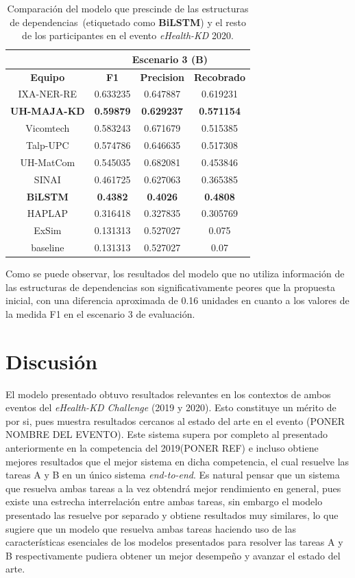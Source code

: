 \begin{table}[tb!]\centering
	\begin{tabular}{|c|c|c|c|}
		\hline
		&  \multicolumn{3}{c|}{\textbf{Escenario 3 (B)}} \\
		\hline
		\textbf{Equipo} & \textbf{F1} & \textbf{Precision} & \textbf{Recobrado} \\
		\hline
		IXA-NER-RE & 0.633235 & 0.647887 & 0.619231 \\
		\textbf{UH-MAJA-KD} & \textbf{0.59879} & \textbf{0.629237} & \textbf{0.571154} \\
		Vicomtech & 0.583243 & 0.671679 & 0.515385 \\
		Talp-UPC & 0.574786 & 0.646635 & 0.517308 \\
		UH-MatCom & 0.545035 & 0.682081 & 0.453846 \\
		SINAI & 0.461725 & 0.627063 & 0.365385 \\
		\textbf{BiLSTM} & \textbf{0.4382} & \textbf{0.4026} & \textbf{0.4808} \\
		HAPLAP & 0.316418 & 0.327835 & 0.305769 \\
		ExSim & 0.131313 & 0.527027 & 0.075 \\
		baseline & 0.131313 & 0.527027 & 0.07 \\	
		\hline
	\end{tabular}
	\caption{Comparación del modelo que prescinde de las estructuras de dependencias~(etiquetado como \textbf{BiLSTM}) y el resto de los participantes en el evento \textit{eHealth-KD} 2020. \label{table:dep_tree_hip}}
\end{table}

Como se puede observar, los resultados del modelo que no utiliza información de las estructuras de dependencias son significativamente peores que la propuesta inicial, con una diferencia aproximada de 0.16 unidades en cuanto a los valores de la medida F1 en el escenario 3 de evaluación.


\section{Discusión}
El modelo presentado obtuvo resultados relevantes en los contextos de ambos eventos del \emph{eHealth-KD Challenge} (2019 y 2020). Esto constituye un m\'erito de por si, pues muestra resultados cercanos al estado del arte en el evento (PONER NOMBRE DEL EVENTO). Este sistema supera por completo al presentado anteriormente en la competencia del 2019(PONER REF) e incluso obtiene mejores resultados que el mejor sistema en dicha competencia, el cual resuelve las tareas A y B en un \'unico sistema \emph{end-to-end}. Es natural pensar que un sistema que resuelva ambas tareas a la vez obtendr\'a mejor rendimiento en general, pues existe una estrecha interrelaci\'on entre ambas tareas, sin embargo el modelo presentado las resuelve por separado y obtiene resultados muy similares, lo que sugiere que un modelo que resuelva ambas tareas haciendo uso de las caracter\'isticas esenciales de los modelos presentados para resolver las tareas A y B respectivamente pudiera obtener un mejor desempe\~no y avanzar el estado del arte.

